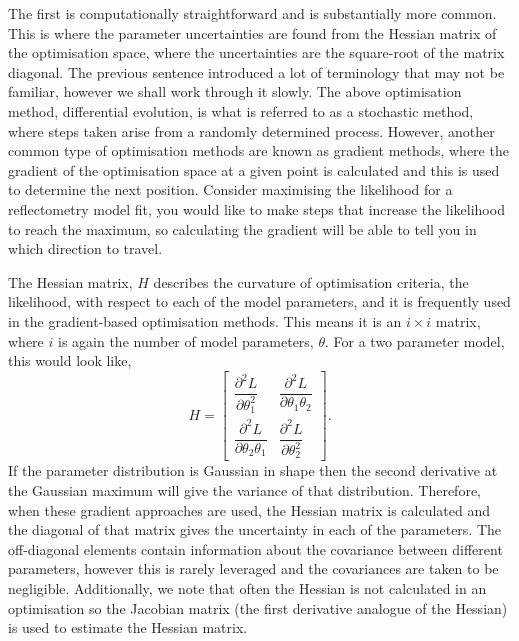 \documentclass[
 reprint,
 superscriptaddress,
 amsmath,amssymb,
 aps,
]{revtex4-1}
\begin{document}
The first is computationally straightforward and is substantially more common.
This is where the parameter uncertainties are found from the Hessian matrix of the optimisation space, where the uncertainties are the square-root of the matrix diagonal.
The previous sentence introduced a lot of terminology that may not be familiar, however we shall work through it slowly.
The above optimisation method, differential evolution, is what is referred to as a stochastic method, where steps taken arise from a randomly determined process.
However, another common type of optimisation methods are known as gradient methods, where the gradient of the optimisation space at a given point is calculated and this is used to determine the next position.
Consider maximising the likelihood for a reflectometry model fit, you would like to make steps that increase the likelihood to reach the maximum, so calculating the gradient will be able to tell you in which direction to travel.

The Hessian matrix, $H$ describes the curvature of optimisation criteria, the likelihood, with respect to each of the model parameters, and it is frequently used in the gradient-based optimisation methods.
This means it is an $i\times i$ matrix, where $i$ is again the number of model parameters, $\theta$. For a two parameter model, this would look like,
%
\begin{equation}
    H =
    \left[\begin{matrix}
        \dfrac{\partial^2 L}{\partial \theta_{1}^2} & \dfrac{\partial^2 L}{\partial \theta_1 \theta_2} \\[6pt]
        \dfrac{\partial^2 L}{\partial \theta_2 \theta_1} & \dfrac{\partial^2 L}{\partial \theta_{2}^2}
    \end{matrix}\right].
\end{equation}
%
If the parameter distribution is Gaussian in shape then the second derivative at the Gaussian maximum will give the variance of that distribution.
Therefore, when these gradient approaches are used, the Hessian matrix is calculated and the diagonal of that matrix gives the uncertainty in each of the parameters.
The off-diagonal elements contain information about the covariance between different parameters, however this is rarely leveraged and the covariances are taken to be negligible.
Additionally, we note that often the Hessian is not calculated in an optimisation so the Jacobian matrix (the first derivative analogue of the Hessian) is used to estimate the Hessian matrix.
\end{document}

